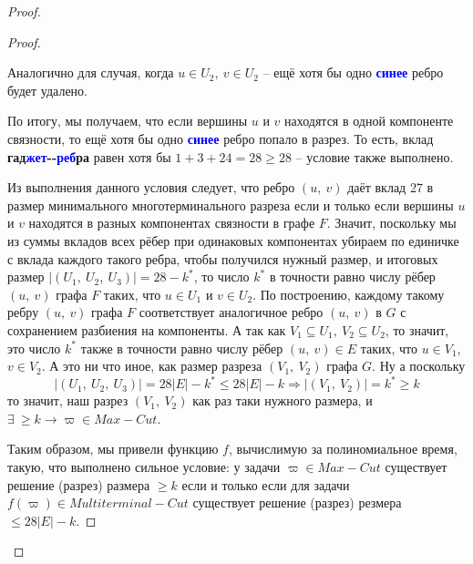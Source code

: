 \documentclass[a4paper,12pt]{article}
\begin{document}
\begin{proof}
\begin{proof}
\begin{itemize}
            Аналогично для случая, когда $u \in U_2,\ v \in U_2$ -- ещё хотя бы одно \textbf{\textcolor{blue}{синее}} ребро будет удалено. 
            
            По итогу, мы получаем, что если вершины $u$ и $v$ находятся в одной компоненте связности, то ещё хотя бы одно \textbf{\textcolor{blue}{синее}} ребро попало в разрез. То есть, вклад \textbf{гад}\textbf{\textcolor{blue}{жет}}\textbf{-}\textbf{-}\textbf{\textcolor{blue}{реб}}\textbf{ра} равен хотя бы $1 + 3 + 24 = 28 \geqslant 28$ -- условие также выполнено. 
            
            Из выполнения данного условия следует, что ребро $(u,\ v)$ даёт вклад 27 в размер минимального многотерминального разреза если и только если вершины $u$ и $v$ находятся в разных компонентах связности в графе $F$. Значит, поскольку мы из суммы вкладов всех рёбер при одинаковых компонентах убираем по единичке с вклада каждого такого ребра, чтобы получился нужный размер, и итоговых размер $|(U_1,\ U_2,\ U_3)| = 28 - k^*$, то число $k^*$ в точности равно числу рёбер $(u,\ v)$ графа $F$ таких, что $u \in U_1$ и $v \in U_2$. По построению, каждому такому ребру $(u,\ v)$ графа $F$ соответствует аналогичное ребро $(u,\ v)$ в $G$ с сохранением разбиения на компоненты. А так как $V_1 \subseteq U_1,\ V_2 \subseteq U_2$, то значит, это число $k^*$ также в точности равно числу рёбер $(u,\ v) \in E$ таких, что $u \in V_1$, $v \in V_2$. А это ни что иное, как размер разреза $(V_1,\ V_2)$ графа $G$. Ну а поскольку
            \[|(U_1,\ U_2,\ U_3)| = 28|E| - k^* \leqslant 28|E| - k \Longrightarrow |(V_1,\ V_2)| = k^* \geqslant k\]то значит, наш разрез $(V_1,\ V_2)$ как раз таки нужного размера, и $\exists\ \geqslant k\to\varpi \in Max-Cut$.
        \end{itemize}
        
        Таким образом, мы привели функцию $f$, вычислимую за полиномиальное время, такую, что выполнено сильное условие:  у задачи $\varpi \in Max-Cut$ существует решение (разрез) размера $\geqslant k$ если и только если для задачи $f(\varpi) \in Multiterminal-Cut$ существует решение (разрез) резмера $\leqslant 28|E| - k$. 
        

\end{proof}
\end{proof}
\end{document}
